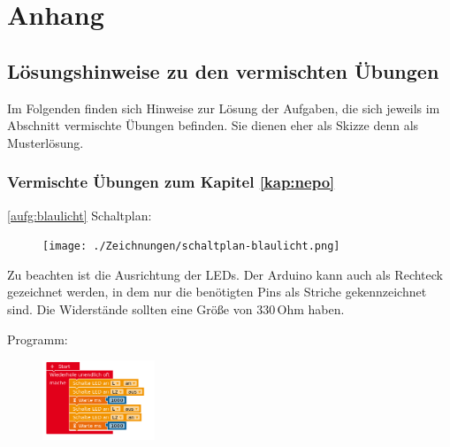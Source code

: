 \chapter{Anhang}

\section{Lösungshinweise zu den vermischten Übungen}
\label{sec:loesungen}
Im Folgenden finden sich Hinweise zur Lösung der Aufgaben, die sich jeweils im Abschnitt vermischte Übungen befinden. Sie dienen eher als Skizze denn als Musterlösung.

\subsection{Vermischte Übungen zum Kapitel \ref{kap:nepo}}
\label{sec:lsg-nepo}

\begin{loesung}{\ref{aufg:blaulicht}}
	Schaltplan:
	
	\begin{figure}[H]
		\centering
		\texttt{[image: ./Zeichnungen/schaltplan-blaulicht.png]}
	\end{figure}
		
	Zu beachten ist die Ausrichtung der LEDs. Der Arduino kann auch als Rechteck gezeichnet werden, in dem nur die benötigten Pins als Striche gekennzeichnet sind. Die Widerstände sollten eine Größe von 330\,Ohm haben.
	
	Programm:
	
	\begin{figure}[H]
		\centering
		\includegraphics[width=0.3\textwidth]{./lsg/prog-blaulicht.png}	
	\end{figure}	
\end{loesung}

